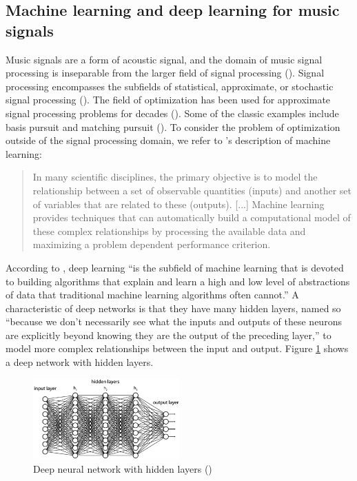 \documentclass[report.tex]{subfiles}
\begin{document}
\newpagefill

\subsection{Machine learning and deep learning for music signals}
\label{sec:ml}

Music signals are a form of acoustic signal, and the domain of music signal processing is inseparable from the larger field of signal processing (\cite{musicsp}). Signal processing encompasses the subfields of statistical, approximate, or stochastic signal processing (\cite{stochasticsp, statisticalsp}). The field of optimization has been used for approximate signal processing problems for decades (\cite{optsp}). Some of the classic examples include basis pursuit and matching pursuit (\cite{dictionary1, dictionary2}). To consider the problem of optimization outside of the signal processing domain, we refer to \textcite{introtoml}'s description of machine learning:

\begin{quote}
	In many scientific disciplines, the primary objective is to model the relationship between a set of observable quantities (inputs) and another set of variables that are related to these (outputs). [...] Machine learning provides techniques that can automatically build a computational model of these complex relationships by processing the available data and maximizing a problem dependent performance criterion.
\end{quote}

According to \textcite{introtodl}, deep learning ``is the subfield of machine learning that is devoted to building algorithms that explain and learn a high and low level of abstractions of data that traditional machine learning algorithms often cannot.'' A characteristic of deep networks is that they have many hidden layers, named so ``because we don't necessarily see what the inputs and outputs of these neurons are explicitly beyond knowing they are the output of the preceding layer,'' to model more complex relationships between the input and output. Figure \ref{fig:fcdn} shows a deep network with hidden layers.

\begin{figure}[ht]
	\centering
	\includegraphics[width=0.5\textwidth]{./images-neural/dnn.png}
	\caption{Deep neural network with hidden layers (\cite{introtodl})}
	\label{fig:fcdn}
\end{figure}
\end{document}

